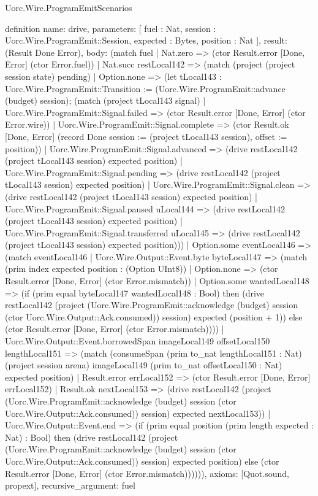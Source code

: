 \begin{lexlean}{Uorc.Wire.ProgramEmitScenarios}
\begin{semanticmodule}
definition{
  name: drive,
  parameters: [
    fuel : Nat,
    session : Uorc.Wire.ProgramEmit::Session,
    expected : Bytes,
    position : Nat
  ],
  result: (Result Done Error),
  body: (match fuel
    | Nat.zero => (ctor Result.error [Done, Error] (ctor Error.fuel))
    | Nat.succ restLocal142 => (match (project (project session state) pending)
      | Option.none => (let tLocal143 : Uorc.Wire.ProgramEmit::Transition := (Uorc.Wire.ProgramEmit::advance (budget) session); (match (project tLocal143 signal)
        | Uorc.Wire.ProgramEmit::Signal.failed => (ctor Result.error [Done, Error] (ctor Error.wire))
        | Uorc.Wire.ProgramEmit::Signal.complete => (ctor Result.ok [Done, Error] (record Done {session := (project tLocal143 session), offset := position}))
        | Uorc.Wire.ProgramEmit::Signal.advanced => (drive restLocal142 (project tLocal143 session) expected position)
        | Uorc.Wire.ProgramEmit::Signal.pending => (drive restLocal142 (project tLocal143 session) expected position)
        | Uorc.Wire.ProgramEmit::Signal.clean => (drive restLocal142 (project tLocal143 session) expected position)
        | Uorc.Wire.ProgramEmit::Signal.paused uLocal144 => (drive restLocal142 (project tLocal143 session) expected position)
        | Uorc.Wire.ProgramEmit::Signal.transferred uLocal145 => (drive restLocal142 (project tLocal143 session) expected position)))
      | Option.some eventLocal146 => (match eventLocal146
        | Uorc.Wire.Output::Event.byte byteLocal147 => (match (prim index expected position : (Option UInt8))
          | Option.none => (ctor Result.error [Done, Error] (ctor Error.mismatch))
          | Option.some wantedLocal148 => (if (prim equal byteLocal147 wantedLocal148 : Bool) then (drive restLocal142 (project (Uorc.Wire.ProgramEmit::acknowledge (budget) session (ctor Uorc.Wire.Output::Ack.consumed)) session) expected (position + 1)) else (ctor Result.error [Done, Error] (ctor Error.mismatch))))
        | Uorc.Wire.Output::Event.borrowedSpan imageLocal149 offsetLocal150 lengthLocal151 => (match (consumeSpan (prim to_nat lengthLocal151 : Nat) (project session arena) imageLocal149 (prim to_nat offsetLocal150 : Nat) expected position)
          | Result.error errLocal152 => (ctor Result.error [Done, Error] errLocal152)
          | Result.ok nextLocal153 => (drive restLocal142 (project (Uorc.Wire.ProgramEmit::acknowledge (budget) session (ctor Uorc.Wire.Output::Ack.consumed)) session) expected nextLocal153))
        | Uorc.Wire.Output::Event.end => (if (prim equal position (prim length expected : Nat) : Bool) then (drive restLocal142 (project (Uorc.Wire.ProgramEmit::acknowledge (budget) session (ctor Uorc.Wire.Output::Ack.consumed)) session) expected position) else (ctor Result.error [Done, Error] (ctor Error.mismatch)))))),
  axioms: [Quot.sound, propext],
  recursive_argument: fuel
}


\end{semanticmodule}
\end{lexlean}
